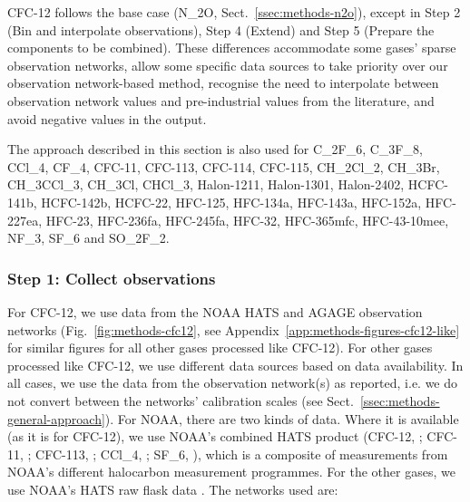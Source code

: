 CFC-12 follows the base case (N_2O, Sect.~\ref{ssec:methods-n2o}),
except in Step 2 (Bin and interpolate observations), Step 4 (Extend) and Step 5 (Prepare the components to be combined).
These differences accommodate some gases' sparse observation networks,
allow some specific data sources to take priority over our observation network-based method,
recognise the need to interpolate between observation network values and pre-industrial values from the literature,
and avoid negative values in the output.

The approach described in this section is also used for
C_2F_6, C_3F_8, CCl_4, CF_4,
CFC-11, CFC-113, CFC-114, CFC-115,
CH_2Cl_2, CH_3Br, CH_3CCl_3, CH_3Cl, CHCl_3,
Halon-1211, Halon-1301, Halon-2402,
HCFC-141b, HCFC-142b, HCFC-22,
HFC-125, HFC-134a, HFC-143a, HFC-152a, HFC-227ea, HFC-23, HFC-236fa, HFC-245fa, HFC-32, HFC-365mfc, HFC-43-10mee,
NF_3, SF_6 and SO_2F_2.

\subsubsection{Step 1: Collect observations}
\label{sssec:methods-cfc12-like-collect-observations}

For CFC-12, we use data from
the NOAA HATS \citep{dutton_hats-cfc12_2022}
and AGAGE \citep{prinn_ale-gage-agage_2000,prinn_agage_2018}
observation networks
(Fig.~\ref{fig:methods-cfc12},
see Appendix~\ref{app:methods-figures-cfc12-like} for similar figures for all other gases processed like CFC-12).
For other gases processed like CFC-12, we use different data sources based on data availability.
In all cases, we use the data from the observation network(s) as reported,
i.e. we do not convert between the networks' calibration scales
(see Sect.~\ref{ssec:methods-general-approach}).
For NOAA, there are two kinds of data.
Where it is available (as it is for CFC-12), we use NOAA's combined HATS product
(CFC-12, \citealp{dutton_hats-cfc12_2022}; CFC-11, \citealp{dutton_hats-cfc11_2022}; CFC-113, \citealp{dutton_hats-cfc113_2022};
CCl_4, \citealp{dutton_hats-ccl4_2022}; SF_6, \citealp{dutton_hats-sf6_2022}),
which is a composite of measurements from NOAA's different halocarbon measurement programmes.
For the other gases, we use NOAA's HATS raw flask data \citep{montzka_ods_1999}.
The networks used are:

